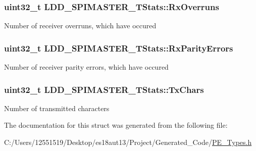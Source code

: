 \subsubsection[{Rx\+Overruns}]{\setlength{\rightskip}{0pt plus 5cm}uint32\+\_\+t L\+D\+D\+\_\+\+S\+P\+I\+M\+A\+S\+T\+E\+R\+\_\+\+T\+Stats\+::\+Rx\+Overruns}\label{struct_l_d_d___s_p_i_m_a_s_t_e_r___t_stats_a528cf1d78c49b42ae455ba895987ece5}
Number of receiver overruns, which have occured \hypertarget{struct_l_d_d___s_p_i_m_a_s_t_e_r___t_stats_a83f9f4b7598e6d84e6842539cc54619f}{}
\subsubsection[{Rx\+Parity\+Errors}]{\setlength{\rightskip}{0pt plus 5cm}uint32\+\_\+t L\+D\+D\+\_\+\+S\+P\+I\+M\+A\+S\+T\+E\+R\+\_\+\+T\+Stats\+::\+Rx\+Parity\+Errors}\label{struct_l_d_d___s_p_i_m_a_s_t_e_r___t_stats_a83f9f4b7598e6d84e6842539cc54619f}
Number of receiver parity errors, which have occured \hypertarget{struct_l_d_d___s_p_i_m_a_s_t_e_r___t_stats_af5376883e99d71f857999d58b2888f95}{}
\subsubsection[{Tx\+Chars}]{\setlength{\rightskip}{0pt plus 5cm}uint32\+\_\+t L\+D\+D\+\_\+\+S\+P\+I\+M\+A\+S\+T\+E\+R\+\_\+\+T\+Stats\+::\+Tx\+Chars}\label{struct_l_d_d___s_p_i_m_a_s_t_e_r___t_stats_af5376883e99d71f857999d58b2888f95}
Number of transmitted characters 

The documentation for this struct was generated from the following file\+:\begin{DoxyCompactItemize}
\item 
C\+:/\+Users/12551519/\+Desktop/es18aut13/\+Project/\+Generated\+\_\+\+Code/\hyperlink{_p_e___types_8h}{P\+E\+\_\+\+Types.\+h}\end{DoxyCompactItemize}
